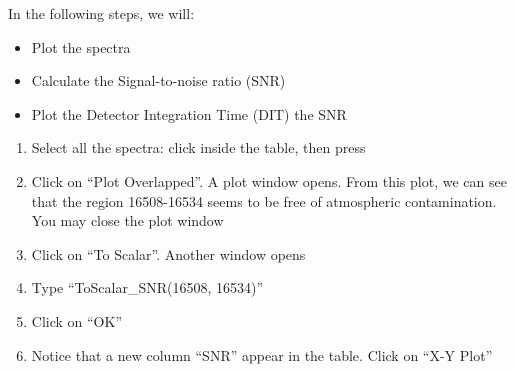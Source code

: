 \documentclass[letterpaper,10pt,english]{sphinxmanual}
\begin{document}
\begin{sphinxVerbatim}[commandchars=\\\{\}]
 
\end{sphinxVerbatim}

In the following steps, we will:
\begin{itemize}
\item {} 
Plot the spectra

\item {} 
Calculate the Signal-to-noise ratio (SNR)

\item {} 
Plot the Detector Integration Time (DIT)  the SNR

\end{itemize}
\begin{enumerate}
\item {} 
Select all the spectra: click inside the table, then press 

\end{enumerate}

\begin{enumerate}
\setcounter{enumi}{1}
\item {} 
Click on “Plot Overlapped”. A plot window opens. From this plot, we can see that the region
16508-16534 seems to be free of atmospheric contamination. You may close the plot window

\end{enumerate}

\begin{enumerate}
\setcounter{enumi}{2}
\item {} 
Click on “To Scalar”. Another window opens

\item {} 
Type “ToScalar\_SNR(16508, 16534)”

\item {} 
Click on “OK”

\end{enumerate}

\begin{enumerate}
\setcounter{enumi}{5}
\item {} 
Notice that a new column “SNR” appear in the table. Click on “X-Y Plot”

\end{enumerate}
\end{document}
